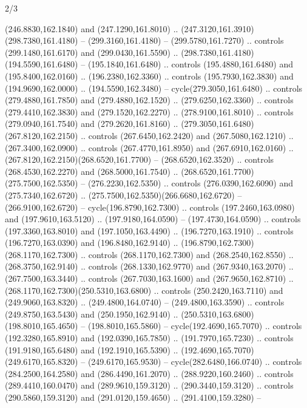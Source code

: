 \begin{flagdescription}{2/3}
\begin{scope}[xshift=0.5\flaglength,yshift=0.5\flagwidth,scale=\flagwidth/259.2]
\begin{scope}[y=0.8pt, x=0.8pt, yscale=-1,shift={(-243,-162)}]
      (246.8830,162.1840) and (247.1290,161.8010) ..
      (247.3120,161.3910)(298.7380,161.4180) -- (299.3160,161.4180) --
      (299.5780,161.7270) .. controls (299.1480,161.6170) and (299.0430,161.5590) ..
      (298.7380,161.4180)(194.5590,161.6480) -- (195.1840,161.6480) .. controls
      (195.4880,161.6480) and (195.8400,162.0160) .. (196.2380,162.3360) .. controls
      (195.7930,162.3830) and (194.9690,162.0000) .. (194.5590,162.3480) --
      cycle(279.3050,161.6480) .. controls (279.4880,161.7850) and
      (279.4880,162.1520) .. (279.6250,162.3360) .. controls (279.4410,162.3830) and
      (279.1520,162.2270) .. (278.9100,161.8010) .. controls (279.0940,161.7540) and
      (279.2620,161.8160) .. (279.3050,161.6480)(267.8120,162.2150) .. controls
      (267.6450,162.2420) and (267.5080,162.1210) .. (267.3400,162.0900) .. controls
      (267.4770,161.8950) and (267.6910,162.0160) ..
      (267.8120,162.2150)(268.6520,161.7700) -- (268.6520,162.3520) .. controls
      (268.4530,162.2270) and (268.5000,161.7540) ..
      (268.6520,161.7700)(275.7500,162.5350) -- (276.2230,162.5350) .. controls
      (276.0390,162.6090) and (275.7340,162.6720) ..
      (275.7500,162.5350)(266.6680,162.6720) -- (266.9100,162.6720) --
      cycle(196.8790,162.7300) .. controls (197.2460,163.0980) and
      (197.9610,163.5120) .. (197.9180,164.0590) -- (197.4730,164.0590) .. controls
      (197.3360,163.8010) and (197.1050,163.4490) .. (196.7270,163.1910) .. controls
      (196.7270,163.0390) and (196.8480,162.9140) ..
      (196.8790,162.7300)(268.1170,162.7300) .. controls (268.1170,162.7300) and
      (268.2540,162.8550) .. (268.3750,162.9140) .. controls (268.1330,162.9770) and
      (267.9340,163.2070) .. (267.7500,163.3440) .. controls (267.7030,163.1600) and
      (267.9650,162.8710) .. (268.1170,162.7300)(250.5310,163.6800) .. controls
      (250.2420,163.7110) and (249.9060,163.8320) .. (249.4800,164.0740) --
      (249.4800,163.3590) .. controls (249.8750,163.5430) and (250.1950,162.9140) ..
      (250.5310,163.6800)(198.8010,165.4650) -- (198.8010,165.5860) --
      cycle(192.4690,165.7070) .. controls (192.3280,165.8910) and
      (192.0390,165.7850) .. (191.7970,165.7230) .. controls (191.9180,165.6480) and
      (192.1910,165.5390) .. (192.4690,165.7070)(249.6170,165.8320) --
      (249.6170,165.9530) -- cycle(282.6480,166.0740) .. controls
      (284.2500,164.2580) and (286.4490,161.2070) .. (288.9220,160.2460) .. controls
      (289.4410,160.0470) and (289.9610,159.3120) .. (290.3440,159.3120) .. controls
      (290.5860,159.3120) and (291.0120,159.4650) .. (291.4100,159.3280) --

\end{scope}
\end{scope}
\end{flagdescription}
